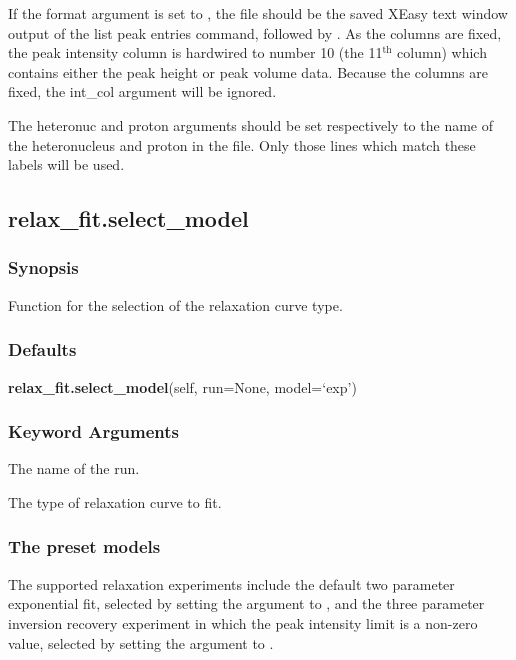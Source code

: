  If the format argument is set to , the file should be the saved XEasy text window output of the list peak entries command,  followed by .  As the columns are fixed, the peak intensity column is hardwired to number 10 (the 11$^\mathrm{th}$ column) which contains either the peak height or peak volume data.  Because the columns are fixed, the int\_col argument will be ignored. 
  

 The heteronuc and proton arguments should be set respectively to the name of the heteronucleus and proton in the file.  Only those lines which match these labels will be used. 
  

  

 \newpage 

 \subsection{relax\_fit.select\_model} 

  
 \subsubsection{Synopsis} 

 Function for the selection of the relaxation curve type. 
  

  
 \subsubsection{Defaults} 

 \textsf{\textbf{relax\_fit.select\_model}(self, run=None, model=`exp')} 

  
 \subsubsection{Keyword Arguments} 

   The name of the run.   

   The type of relaxation curve to fit.  

  

  
 \subsubsection{The preset models} 

 The supported relaxation experiments include the default two parameter exponential fit, selected by setting the  argument to , and the three parameter inversion recovery experiment in which the peak intensity limit is a non-zero value, selected by setting the argument to . 
  

